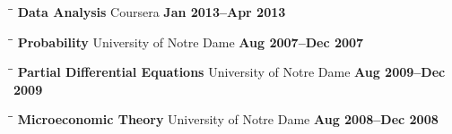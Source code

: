 \documentclass{resume}
\begin{document}
\begin{resume}
    \begin{tabbing}
        \hspace{2.3in}\= \hspace{2.6in}\= \kill
        {\bf Data Analysis} \> Coursera \>  
        \textbf{Jan 2013--Apr 2013}
    \end{tabbing}
    \vspace{-0.4in}

    \begin{tabbing}
        \hspace{2.3in}\= \hspace{2.6in}\= \kill
        {\bf Probability } \> University of Notre Dame \>  
        \textbf{Aug 2007--Dec 2007}
    \end{tabbing}
    \vspace{-0.4in}

    \begin{tabbing}
        \hspace{2.3in}\= \hspace{2.6in}\= \kill
        {\bf Partial Differential Equations} \> University of Notre Dame \>  
        \textbf{Aug 2009--Dec 2009}
    \end{tabbing}
    \vspace{-0.4in}

    \begin{tabbing}
        \hspace{2.3in}\= \hspace{2.6in}\= \kill
        {\bf Microeconomic Theory } \> University of Notre Dame \>  
        \textbf{Aug 2008--Dec 2008}
    \end{tabbing}


\end{resume}
\end{document}
